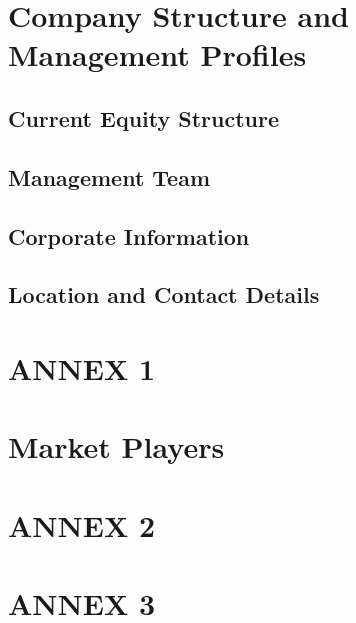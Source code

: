 \documentclass[11pt]{article}
\begin{document}
\section{Company Structure and Management Profiles}
  \subsection{Current Equity Structure}
  \subsection{Management Team}
  \subsection{Corporate Information}
  \subsection{Location and Contact Details}
\newpage
\section{ANNEX 1}
\newpage
\section{Market Players}
\newpage
\section{ANNEX 2}
\newpage
\section{ANNEX 3}
\newpage
\end{document}
